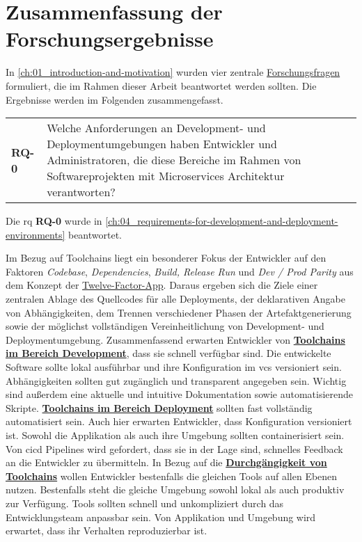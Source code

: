 \section{Zusammenfassung der Forschungsergebnisse}
\label{sec:07-01_summary-of-research-results}

In \autoref{ch:01_introduction-and-motivation} wurden vier zentrale \hyperref[sec:01-03_objectives-and-research-questions]{Forschungsfragen} formuliert, die im Rahmen dieser Arbeit beantwortet werden sollten. Die Ergebnisse werden im Folgenden zusammengefasst.

\vspace{1em}
\begin{table}[H]
    \centering
    \begin{tabular}{p{} p{}}
        \textbf{RQ-0} & Welche Anforderungen an Development- und Deploymentumgebungen haben Entwickler und Administratoren, die diese Bereiche im Rahmen von Softwareprojekten mit Microservices Architektur verantworten? \\
    \end{tabular}
\end{table}

Die \acrlong{rq} \textbf{RQ-0} wurde in \autoref{ch:04_requirements-for-development-and-deployment-environments} beantwortet.

Im Bezug auf Toolchains liegt ein besonderer Fokus der Entwickler auf den Faktoren \textit{Codebase}, \textit{Dependencies}, \textit{Build, Release Run} und \textit{Dev / Prod Parity} aus dem Konzept der \hyperref[sec:03-05_basic-idea-of-twelve-factor-app]{Twelve-Factor-App}. Daraus ergeben sich die Ziele einer zentralen Ablage des Quellcodes für alle Deployments, der deklarativen Angabe von Abhängigkeiten, dem Trennen verschiedener Phasen der Artefaktgenerierung sowie der möglichst vollständigen Vereinheitlichung von Development- und Deploymentumgebung. Zusammenfassend erwarten Entwickler von \textbf{\hyperref[subsec:04-02-02_toolchains-in-development]{Toolchains im Bereich Development}}, dass sie schnell verfügbar sind. Die entwickelte Software sollte lokal ausführbar und ihre Konfiguration im \Gls{vcs} versioniert sein. Abhängigkeiten sollten gut zugänglich und transparent angegeben sein. Wichtig sind außerdem eine aktuelle und intuitive Dokumentation sowie automatisierende Skripte. \textbf{\hyperref[subsec:04-02-03_toolchains-in-deployment]{Toolchains im Bereich Deployment}} sollten fast vollständig automatisiert sein. Auch hier erwarten Entwickler, dass Konfiguration versioniert ist. Sowohl die Applikation als auch ihre Umgebung sollten containerisiert sein. Von \Gls{cicd} Pipelines wird gefordert, dass sie in der Lage sind, schnelles Feedback an die Entwickler zu übermitteln. In Bezug auf die \textbf{\hyperref[subsec:04-02-04_consistency-of-toolchains]{Durchgängigkeit von Toolchains}} wollen Entwickler bestenfalls die gleichen Tools auf allen Ebenen nutzen. Bestenfalls steht die gleiche Umgebung sowohl lokal als auch produktiv zur Verfügung. Tools sollten schnell und unkompliziert durch das Entwicklungsteam anpassbar sein. Von Applikation und Umgebung wird erwartet, dass ihr Verhalten reproduzierbar ist.

